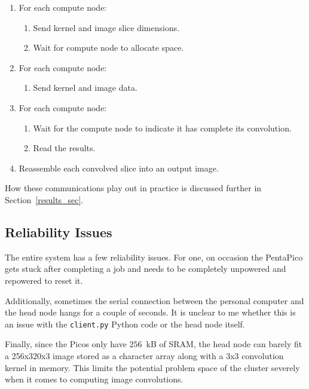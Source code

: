 \documentclass[conference]{IEEEtran}
\begin{document}
\begin{enumerate}
    \item For each compute node:
    \begin{enumerate}
        \item Send kernel and image slice dimensions.
        \item Wait for compute node to allocate space.
    \end{enumerate}
    \item For each compute node:
    \begin{enumerate}
        \item Send kernel and image data.
    \end{enumerate}
    \item For each compute node:
    \begin{enumerate}
        \item Wait for the compute node to indicate it has complete its convolution.
        \item Read the results.
    \end{enumerate}
    \item Reassemble each convolved slice into an output image.
\end{enumerate}

How these communications play out in practice is discussed further in Section~\ref{results_sec}.

\subsection{Reliability Issues}
\label{reliability_sec}

The entire system has a few reliability issues. 
For one, on occasion the PentaPico gets stuck after completing a job and needs to be completely unpowered and repowered to reset it.

Additionally, sometimes the serial connection between the personal computer and the head node hangs for a couple of seconds.
It is unclear to me whether this is an issue with the \texttt{client.py} Python code or the head node itself.

Finally, since the Picos only have $256$~kB of SRAM, the head node can barely fit a 256x320x3 image stored as a character array along with a 3x3 convolution kernel in memory. 
This limits the potential problem space of the cluster severely when it comes to computing image convolutions.
\end{document}
